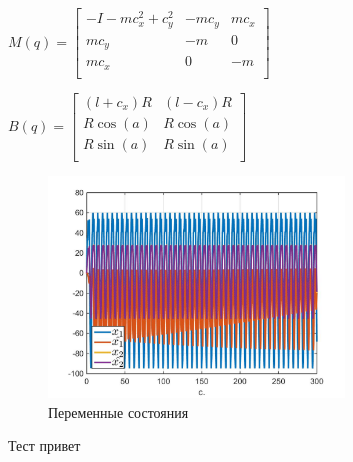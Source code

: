 \documentclass[fleqn, a4paper, 12pt, russian]{article}
\begin{document}
\begin{landscape}
$M(q) = \begin{bmatrix}
	-I-mc_x^2+c_y^2&-mc_y&mc_x\\
	mc_y&-m&0\\
	mc_x&0&-m\\
\end{bmatrix}$

$B(q) = \begin{bmatrix}
    (l+c_x)R&	(l-c_x)R\\
	R\cos(a)&	R\cos(a)\\
	R\sin(a)&	R\sin(a)\\
\end{bmatrix}$

\begin{figure}[!h]
	\centering
	\includegraphics[width = 0.7\textwidth]{modeling62-x.jpg}
	\caption{Переменные состояния} 
	\label{modeling62-x}
\end{figure}

Тест привет

\end{landscape}
	
\end{document}
